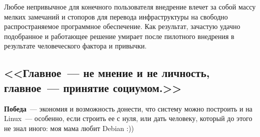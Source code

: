 \documentclass[10pt, a5paper]{article}
\begin{document}
Любое непривычное для конечного пользователя внедрение влечет за собой массу мелких замечаний и стопоров для перевода инфраструктуры на свободно распространяемое программное обеспечение. Как результат, зачастую удачно подобранное и работающее решение умирает после пилотного внедрения в результате человеческого фактора и привычки.

\subsection*{<<Главное~--- не мнение и не личность, главное~--- принятие социумом.>>}

\textbf{Победа}~--- экономия и возможность донести, что систему можно построить и на Linux~--- особенно, если строить ее с нуля, или дать человеку, который до этого не знал иного: моя мама любит Debian :))
\end{document}
